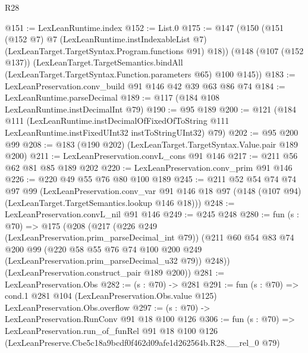 \begin{lexlean}{R28}
\begin{coremodule}
@151 := LexLeanRuntime.index
@152 := List.{0}
@175 := @147
    (@150
      (@151
        (@152 @7)
        @7
        (LexLeanRuntime.instIndexableList @7)
        (LexLeanTarget.TargetSyntax.Program.functions @91)
        @18))
    (@148
      (@107 (@152 @137))
      (LexLeanTarget.TargetSemantics.bindAll
        (LexLeanTarget.TargetSyntax.Function.parameters @65)
        @100
        @145))
@183 := LexLeanPreservation.conv_build @91 @146 @42 @39 @63 @86 @74
@184 := LexLeanRuntime.parseDecimal
@189 := @117 (@184 @108 LexLeanRuntime.instDecimalInt @79)
@190 := @95 @189
@200 := @121
    (@184
      @111
      (LexLeanRuntime.instDecimalOfFixedOfToString
        @111
        LexLeanRuntime.instFixedUInt32
        instToStringUInt32)
      @79)
@202 := @95 @200 @99
@208 := @183 (@190 @202) (LexLeanTarget.TargetSyntax.Value.pair @189 @200)
@211 := LexLeanPreservation.convL_cons @91 @146
@217 := @211 @56 @62 @81 @85 @189 @202
@220 := LexLeanPreservation.conv_prim @91 @146
@226 := @220 @49 @55 @76 @80 @100 @189
@245 := @211
    @52
    @54
    @74
    @74
    @97
    @99
    (LexLeanPreservation.conv_var
      @91
      @146
      @18
      @97
      (@148 (@107 @94) (LexLeanTarget.TargetSemantics.lookup @146 @18)))
@248 := LexLeanPreservation.convL_nil @91 @146
@249 := @245 @248
@280 := fun (s : @70) =>
  @175
    (@208
      (@217
        (@226 @249 (LexLeanPreservation.prim_parseDecimal_int @79))
        (@211
          @60
          @54
          @83
          @74
          @200
          @99
          (@220 @58 @55 @76 @74 @100 @200 @249 (LexLeanPreservation.prim_parseDecimal_u32 @79))
          @248))
      (LexLeanPreservation.construct_pair @189 @200))
@281 := LexLeanPreservation.Obs
@282 := (s : @70) -> @281
@291 := fun (s : @70) =>
  cond.{1} @281 @104 (LexLeanPreservation.Obs.value @125) LexLeanPreservation.Obs.overflow
@297 := (s : @70) -> LexLeanPreservation.RunConv @91 @18 @100 @126
@306 := fun (s : @70) =>
  LexLeanPreservation.run_of_funRel
    @91
    @18
    @100
    @126
    (LexLeanPreserve.Cbe5c18a9bcdf0f462d09afe1d262564b.R28.__rel_0 @79)
\end{coremodule}
\end{lexlean}
